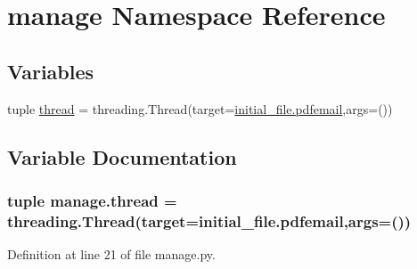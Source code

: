 \hypertarget{namespacemanage}{}\section{manage Namespace Reference}
\label{namespacemanage}
\subsection*{Variables}
\begin{DoxyCompactItemize}
\item 
tuple \hyperlink{namespacemanage_ab0c13dd165a5c8a6f3e3c029a2acd921}{thread} = threading.\+Thread(target=\hyperlink{namespaceinitial__file_a105b1aa7bf4db853b6f4d064ed224030}{initial\+\_\+file.\+pdfemail},args=())
\end{DoxyCompactItemize}


\subsection{Variable Documentation}
\hypertarget{namespacemanage_ab0c13dd165a5c8a6f3e3c029a2acd921}{}
\subsubsection[{thread}]{\setlength{\rightskip}{0pt plus 5cm}tuple manage.\+thread = threading.\+Thread(target={\bf initial\+\_\+file.\+pdfemail},args=())}\label{namespacemanage_ab0c13dd165a5c8a6f3e3c029a2acd921}


Definition at line 21 of file manage.\+py.

